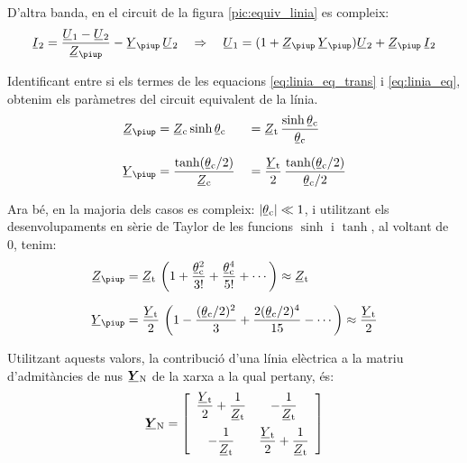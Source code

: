 D'altra banda, en el circuit de la figura \vref{pic:equiv_linia} es compleix:
\begin{equation}\label{eq:linia_eq}
   \cmplx{I}_2 = \frac{\cmplx{U}_1 - \cmplx{U}_2}{\cmplx{Z}_\piup} - \cmplx{Y}_\piup\, \cmplx{U}_2
   \quad \Rightarrow\quad
   \cmplx{U}_1 = (1 + \cmplx{Z}_\piup\,\cmplx{Y}_\piup ) \cmplx{U}_2 + \cmplx{Z}_\piup\,\cmplx{I}_2
\end{equation}

Identificant entre si els termes de les equacions
\eqref{eq:linia_eq_trans} i \eqref{eq:linia_eq}, obtenim els
paràmetres del circuit equivalent de la línia.
\begin{alignat}{2}
   \cmplx{Z}_\piup &= \cmplx{Z}\ped{c} \sinh \cmplx{\theta}\ped{c} &&= \cmplx{Z}\ped{t} \,
   \frac{\sinh \cmplx{\theta}\ped{c}}{\cmplx{\theta}\ped{c}} \\[1.5ex]
   \cmplx{Y}_\piup &= \frac{\tanh (\cmplx{\theta}\ped{c} / 2) }{\cmplx{Z}\ped{c}} &&=
   \frac{\cmplx{Y}\ped{t}}{2} \, \frac{\tanh (\cmplx{\theta}\ped{c} / 2)}{\cmplx{\theta}\ped{c} / 2}
\end{alignat}

Ara bé, en la majoria dels casos es compleix: $|\cmplx{\theta}\ped{c}| \ll 1$, i utilitzant els desenvolupaments en sèrie de Taylor de les funcions $\sinh$ i $\tanh$, al voltant de 0, tenim:
\begin{align}
   \cmplx{Z}_\piup &= \cmplx{Z}\ped{t} \, \left( 1 + \frac{\cmplx{\theta}\ped{c}^2}{3!} +
   \frac{\cmplx{\theta}\ped{c}^4}{5!} + \cdots \right) \approx \cmplx{Z}\ped{t} \\[1.5ex]
   \cmplx{Y}_\piup &= \frac{\cmplx{Y}\ped{t}}{2} \,\left( 1 - \frac{(\cmplx{\theta}\ped{c}/2)^2}{3} + \frac{2 (\cmplx{\theta}\ped{c}/2)^4}{15} - \cdots \right) \approx \frac{\cmplx{Y}\ped{t}}{2}
\end{align}

Utilitzant aquests valors, la contribució d'una línia elèctrica a
la matriu d'admitàncies de nus $\mcmplx{Y}\ped{N}$ de la xarxa a la
qual pertany, és: 
\begin{equation}
   \mcmplx{Y}\ped{N} = 
   \begin{bmatrix}\begin{array}{cc}
     \dfrac{\cmplx{Y}\ped{t}}{2} + \dfrac{1}{\cmplx{Z}\ped{t}} & -\dfrac{1}{\cmplx{Z}\ped{t}}\\[2.5ex]
     -\dfrac{1}{\cmplx{Z}\ped{t}} & \dfrac{\cmplx{Y}\ped{t}}{2} + \dfrac{1}{\cmplx{Z}\ped{t}}
    \end{array}\end{bmatrix}
\end{equation}

